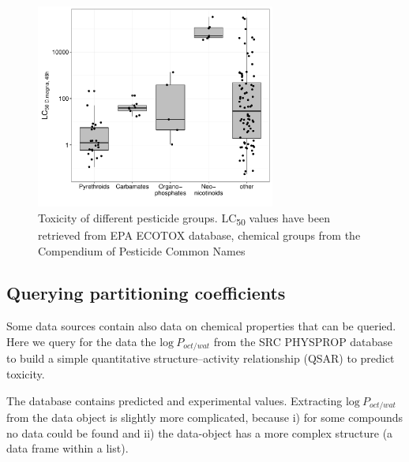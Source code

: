 \documentclass[article, shortnames]{jss}\usepackage[]{graphicx}\usepackage[]{color}
\begin{document}
\begin{figure}[ht]
\begin{CodeChunk}


{\centering \includegraphics[width=0.7\textwidth]{plot_lc50-1} 

}

\end{CodeChunk}
\caption{Toxicity of different pesticide groups. LC\textsubscript{50} values have been retrieved from EPA ECOTOX database, chemical groups from the Compendium of Pesticide Common Names \citep{wood}}
\label{fig:fig2}
\end{figure}


\subsection[Querying partitioning coefficients]{Querying partitioning coefficients}
Some data sources contain also data on chemical properties that can be queried.
Here we query for the  data the $\mathrm{log}~P_{oct/wat}$ from the SRC PHYSPROP database to build a simple quantitative structure–activity relationship (QSAR) to predict toxicity.

\begin{CodeChunk}
\end{CodeChunk}

The database contains predicted and experimental values.
Extracting $~P_{oct/wat}$ from the data object is slightly more complicated,  
because i) for some compounds no data could be found and ii) the data-object has a more complex structure (a data frame within a list).
\end{document}
